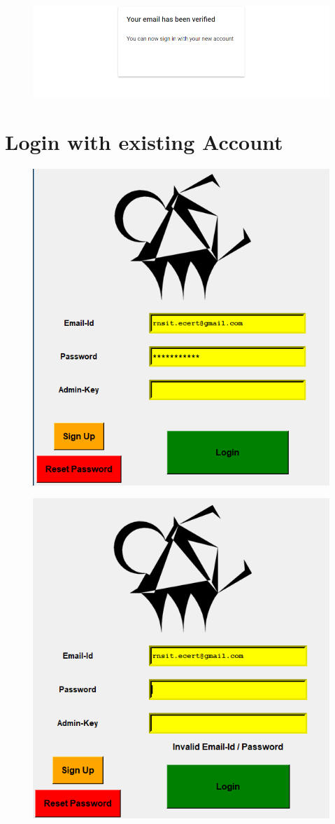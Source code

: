 \begin{figure}[H]
	\centering
	\includegraphics[width=0.95\linewidth]{images/login_page/login_5}
	\label{fig:login5}
\end{figure}

\section{Login with existing Account}

\begin{figure}[H]
	\centering
	\includegraphics[width=0.45\linewidth]{images/login_page/login_2}
	\label{fig:login2}
\end{figure}


\begin{figure}[H]
	\centering
	\includegraphics[width=0.45\linewidth]{images/login_page/login_3}
	\label{fig:login3}
\end{figure}

